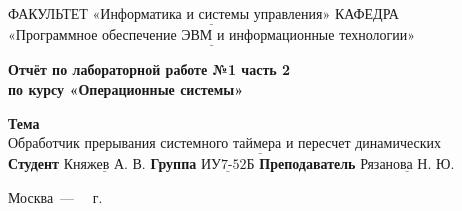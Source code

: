 \begin{titlepage}
	
	\noindent ФАКУЛЬТЕТ $\underline{\text{«Информатика и системы управления»}}$ \newline\newline
	\noindent КАФЕДРА $\underline{\text{«Программное обеспечение ЭВМ и информационные технологии»}}$\newline\newline\newline\newline\newline\newline\newline
	
	\vspace{\baselineskip}

	\begin{center}
		\Large\textbf{Отчёт по лабораторной работе №1 часть 2} \\
		\Large\textbf{по курсу «Операционные системы»} \\
	\end{center}
	\vspace{2.5cm}
	
	\noindent\textbf{Тема} $\underline{\text{Обработчик прерывания системного таймера и пересчет динамических приоритетов}}$\newline\newline
	\noindent\textbf{Студент} $\underline{\text{Княжев А. В.}}$\newline\newline
	\noindent\textbf{Группа} $\underline{\text{ИУ7-52Б}}$\newline\newline
	\noindent\textbf{Преподаватель} $\underline{\text{Рязанова Н. Ю.}}$\newline
	
	\begin{center}
		\vfill
		Москва~---~\the\year
		~г.
	\end{center}
	\restoregeometry
\end{titlepage}